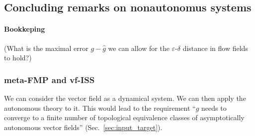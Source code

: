 \documentclass{article}
\newcommand{\ascomment}[1]{\textcolor{ascolor}{(#1)}}
\theoremstyle{definition} \newtheorem{definition}{Definition}
\theoremstyle{remark} \newtheorem{remark}{Remark}
\newcommand{\reals}{\mathbb{R}}
\newcounter{ct}
\begin{document}

%
%





    
\subsection{Concluding remarks on nonautonomus systems}

\paragraph{Bookkeping}
\ascomment{What is the maximal error $g-\hat g$ we can allow for the $\varepsilon$-$\delta$ distance in flow fields to hold?}



\subsubsection{meta-FMP and vf-ISS}
We can consider the vector field as a dynamical system.
We can then apply the autonomous theory to it.
This would lead to the requirement ``$g$ needs to converge to a finite number of topological equivalence classes of asymptotically autonomous vector fields'' (Sec.~\ref{sec:input_target}).
\end{document}
